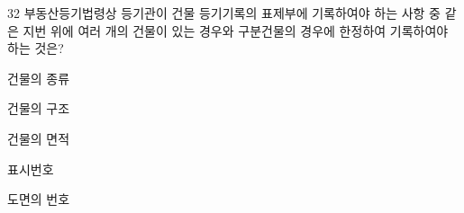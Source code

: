 \begin{question}{32}
부동산등기법령상 등기관이 건물 등기기록의 표제부에 기록하여야 하는 사항 중 같은 지번 위에 여러 개의 건물이 있는 경우와 구분건물의 경우에 한정하여 기록하여야 하는 것은?
\begin{choices}
  \item 건물의 종류
  \item 건물의 구조
  \item 건물의 면적
  \item 표시번호
  \item 도면의 번호
\end{choices}
\end{question}
